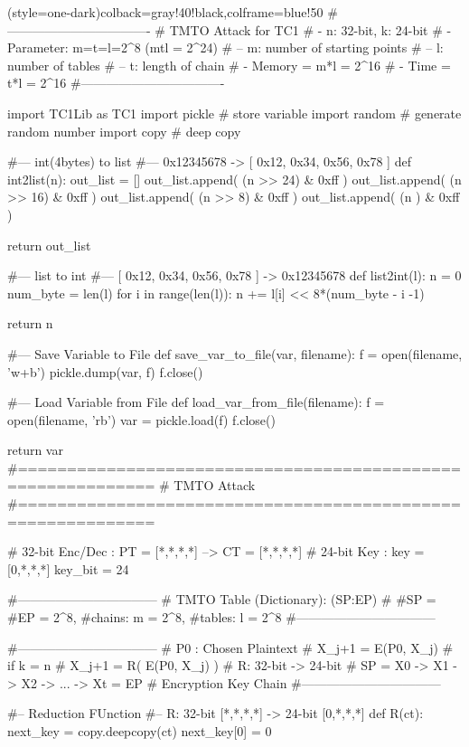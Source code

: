 \begin{python}(style=one-dark){colback=gray!40!black,colframe=blue!50}
#----------------------------------
# TMTO Attack for TC1
# - n: 32-bit, k: 24-bit
# - Parameter: m=t=l=2^8 (mtl = 2^24)
# -- m: number of starting points
# -- l: number of tables
# -- t: length of chain
# - Memory = m*l = 2^16
# - Time   = t*l = 2^16
#----------------------------------

import TC1Lib as TC1
import pickle # store variable
import random # generate random number
import copy   # deep copy 

#--- int(4bytes) to list 
#--- 0x12345678 -> [ 0x12, 0x34, 0x56, 0x78 ]
def int2list(n):
   out_list = []
   out_list.append( (n >> 24) & 0xff )
   out_list.append( (n >> 16) & 0xff )
   out_list.append( (n >>  8) & 0xff )
   out_list.append( (n      ) & 0xff )

   return out_list

#--- list to int
#--- [ 0x12, 0x34, 0x56, 0x78 ] -> 0x12345678
def list2int(l):
   n = 0
   num_byte = len(l)
   for i in range(len(l)):
      n += l[i] << 8*(num_byte - i -1)

   return n

#--- Save Variable to File
def save_var_to_file(var, filename):
   f = open(filename, 'w+b')
   pickle.dump(var, f)
   f.close()

#--- Load Variable from File
   def load_var_from_file(filename):
   f = open(filename, 'rb')
   var = pickle.load(f)
   f.close()
   
   return var
#============================================================
#  TMTO Attack
#============================================================

# 32-bit Enc/Dec : PT = [*,*,*,*] --> CT = [*,*,*,*]
# 24-bit Key     : key = [0,*,*,*]
key_bit = 24

#---------------------------------
# TMTO Table (Dictionary): { (SP:EP) }
#   #SP = #EP = 2^8,   #chains: m = 2^8, #tables: l = 2^8
#---------------------------------

#---------------------------------
# P0 : Chosen Plaintext
# X_{j+1} = E(P0, X_{j}) 		# if k = n
# X_{j+1} = R( E(P0, X_{j}) ) 	   # R: 32-bit -> 24-bit
# SP = X0 -> X1 -> X2 -> ... -> Xt = EP  # Encryption Key Chain
#---------------------------------

#-- Reduction FUnction
#-- R: 32-bit [*,*,*,*] -> 24-bit [0,*,*,*]
def R(ct):
   next_key = copy.deepcopy(ct)
   next_key[0] = 0
	

\end{python}
